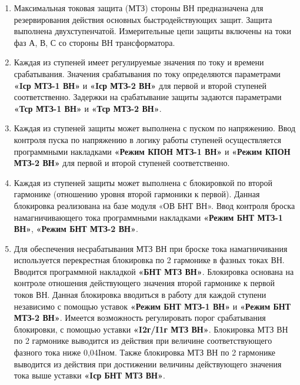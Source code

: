 \color{black}

\begin{enumerate}

\item
Максимальная токовая защита (МТЗ) стороны ВН предназначена для резервирования действия основных быстродействующих защит. Защита выполнена двухступенчатой. Измерительные цепи защиты включены на токи фаз А, В, С со стороны ВН трансформатора.    

\item
Каждая из ступеней имеет регулируемые значения по току и времени срабатывания. Значения срабатывания по току определяются параметрами \textbf{«Iср МТЗ-1 ВН»} и \textbf{«Iср МТЗ-2 ВН»} для первой и
второй ступеней соответственно. Задержки на срабатывание защиты задаются параметрами \textbf{«Тср МТЗ-1 ВН»} и \textbf{«Тср МТЗ-2 ВН»}.

\item
Каждая из ступеней защиты может выполнена с пуском по напряжению. Ввод контроля пуска по напряжению в логику работы ступеней осуществляется программными накладками \textbf{«Режим КПОН МТЗ-1 ВН»} и \textbf{«Режим КПОН МТЗ-2 ВН»} для первой и второй ступеней соответственно. 

\item
Каждая из ступеней защиты может выполнена с блокировкой по второй гармонике (отношению уровня второй гармоники к первой). Данная блокировка реализована на базе модуля «ОВ БНТ ВН». Ввод контроля броска намагничивающего тока программными накладками \textbf{«Режим БНТ МТЗ-1 ВН»}, \textbf{«Режим БНТ МТЗ-2 ВН»}.

\item
Для обеспечения несрабатывания МТЗ ВН при броске тока намагничивания используется перекрестная блокировка по 2 гармонике в фазных токах ВН. Вводится программной накладкой \textbf{«БНТ МТЗ ВН»}. Блокировка основана на контроле отношения действующего значения второй гармонике к первой токов ВН. Данная блокировка вводиться в работу для каждой ступени независимо с помощью уставок \textbf{«Режим БНТ МТЗ-1 ВН»} и \textbf{«Режим БНТ МТЗ-2 ВН»}. Имеется возможность регулировать порог срабатывания блокировки, с помощью уставки \textbf{«I2г/I1г МТЗ ВН»}. Блокировка МТЗ ВН по 2 гармонике выводится из действия при величине соответствующего фазного тока ниже 0,04Iном. Также блокировка МТЗ ВН по 2 гармонике выводится из действия при достижении величины действующего значения тока выше уставки \textbf{«Iср БНТ МТЗ ВН»}.


\end{enumerate}
